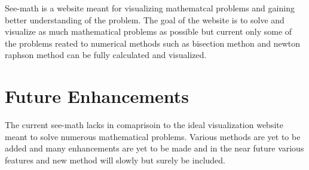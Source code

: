 See-math is a website meant for visualizing mathematcal problems and gaining better understanding of the problem. The goal of the website is to solve and visualize as much mathematical problems as possible but current only some of the problems reated to numerical methods such as bisection methon and newton raphson method can be fully calculated and visualized.

\section{{\bf{Future Enhancements}}}

The current see-math lacks in comaprisoin to the ideal visualization website meant to solve numerous mathematical problems. Various methods are yet to be added and many enhancements are yet to be made and in the near future various features and new method will slowly but surely be included.
